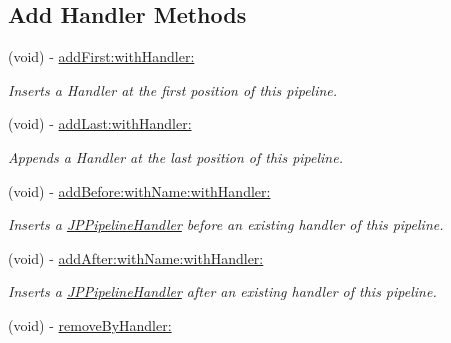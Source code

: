 \subsection*{Add Handler Methods}
\begin{DoxyCompactItemize}
\item 
(void) -\/ \hyperlink{a00019_afe5f3b70a073f7e45d32ad6b0dcd4473}{addFirst:withHandler:}
\begin{DoxyCompactList}\small\item\em Inserts a Handler at the first position of this pipeline. \item\end{DoxyCompactList}\item 
(void) -\/ \hyperlink{a00019_a7a3cb65c4e376339b36fad298fb4674d}{addLast:withHandler:}
\begin{DoxyCompactList}\small\item\em Appends a Handler at the last position of this pipeline. \item\end{DoxyCompactList}\item 
(void) -\/ \hyperlink{a00019_a707e571dbe7a0d4011a32681d6c8b79d}{addBefore:withName:withHandler:}
\begin{DoxyCompactList}\small\item\em Inserts a \hyperlink{a00029}{JPPipelineHandler} before an existing handler of this pipeline. \item\end{DoxyCompactList}\item 
(void) -\/ \hyperlink{a00019_ace4814f6f5dc4e7cc0931af2a041eb7a}{addAfter:withName:withHandler:}
\begin{DoxyCompactList}\small\item\em Inserts a \hyperlink{a00029}{JPPipelineHandler} after an existing handler of this pipeline. \item\end{DoxyCompactList}\item 
\hypertarget{a00019_ac3feebdba37c2134e856e7a5ab02e434}{
(void) -\/ \hyperlink{a00019_ac3feebdba37c2134e856e7a5ab02e434}{removeByHandler:}}
\label{a00019_ac3feebdba37c2134e856e7a5ab02e434}


\end{DoxyCompactItemize}
